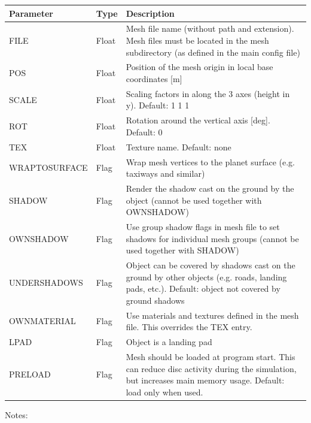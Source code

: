 \documentclass[Orbiter Developer Manual.tex]{subfiles}
\begin{document}
	\begin{longtable}{ |p{}|p{}|p{}| }
	\hline\rule{0pt}{2ex}
	\textbf{Parameter} & \textbf{Type} & \textbf{Description}\\
	\hline\rule{0pt}{2ex}
	FILE & Float & Mesh file name (without path and extension). Mesh files must be located in the mesh subdirectory (as defined in the main config file)\\
	\hline\rule{0pt}{2ex}
	POS & Float & Position of the mesh origin in local base coordinates [m]\\
	\hline\rule{0pt}{2ex}
	SCALE & Float & Scaling factors in along the 3 axes (height in y). Default: 1 1 1\\
	\hline\rule{0pt}{2ex}
	ROT & Float & Rotation around the vertical axis [deg]. Default: 0\\
	\hline\rule{0pt}{2ex}
	TEX & Float & Texture name. Default: none\\
	\hline\rule{0pt}{2ex}
	WRAPTOSURFACE & Flag & Wrap mesh vertices to the planet surface (e.g. taxiways and similar)\\
	\hline\rule{0pt}{2ex}
	SHADOW & Flag & Render the shadow cast on the ground by the object (cannot be used together with OWNSHADOW)\\
	\hline\rule{0pt}{2ex}
	OWNSHADOW & Flag & Use group shadow flags in mesh file to set shadows for individual mesh groups (cannot be used together with SHADOW)\\
	\hline\rule{0pt}{2ex}
	UNDERSHADOWS & Flag & Object can be covered by shadows cast on the ground by other objects (e.g. roads, landing pads, etc.). Default: object not covered by ground shadows\\
	\hline\rule{0pt}{2ex}
	OWNMATERIAL & Flag & Use materials and textures defined in the mesh file. This overrides the TEX entry.\\
	\hline\rule{0pt}{2ex}
	LPAD & Flag & Object is a landing pad\\
	\hline\rule{0pt}{2ex}
	PRELOAD & Flag & Mesh should be loaded at program start. This can reduce disc activity during the simulation, but increases main memory usage. Default: load only when used.\\
	\hline
	\end{longtable}

\noindent
Notes:
\end{document}
